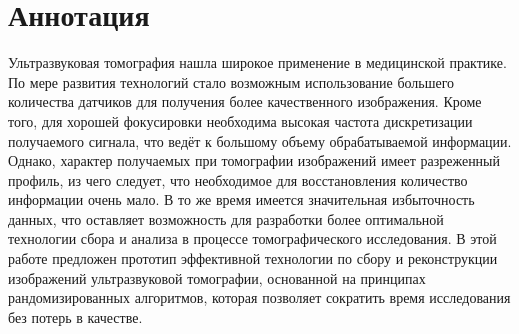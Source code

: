\documentclass[14pt]{matmex-diploma}
\begin{document}
\maketitle
\tableofcontents
\setcounter{section}{0}
\section*{Аннотация}
Ультразвуковая томография нашла широкое применение в медицинской практике. По мере развития технологий стало возможным использование большего количества датчиков для получения более качественного изображения. Кроме того, для хорошей фокусировки необходима высокая частота дискретизации получаемого сигнала, что ведёт к большому объему обрабатываемой информации.  Однако, характер получаемых при томографии изображений имеет разреженный профиль, из чего следует, что необходимое для восстановления количество информации очень мало. В то же время имеется значительная избыточность данных, что оставляет возможность для разработки более оптимальной технологии сбора и анализа в процессе томографического исследования. В этой работе предложен прототип эффективной технологии по сбору и реконструкции изображений ультразвуковой томографии, основанной на принципах рандомизированных алгоритмов, которая позволяет сократить время исследования без потерь в качестве. 
\end{document}
